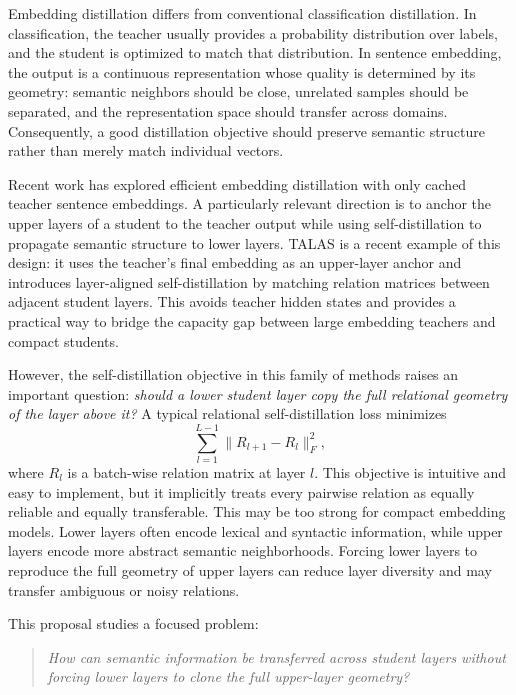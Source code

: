 \documentclass[letterpaper]{article}
\begin{document}
Embedding distillation differs from conventional classification distillation. In classification, the teacher usually provides a probability distribution over labels, and the student is optimized to match that distribution. In sentence embedding, the output is a continuous representation whose quality is determined by its geometry: semantic neighbors should be close, unrelated samples should be separated, and the representation space should transfer across domains. Consequently, a good distillation objective should preserve semantic structure rather than merely match individual vectors.

Recent work has explored efficient embedding distillation with only cached teacher sentence embeddings. A particularly relevant direction is to anchor the upper layers of a student to the teacher output while using self-distillation to propagate semantic structure to lower layers. TALAS is a recent example of this design: it uses the teacher's final embedding as an upper-layer anchor and introduces layer-aligned self-distillation by matching relation matrices between adjacent student layers. This avoids teacher hidden states and provides a practical way to bridge the capacity gap between large embedding teachers and compact students.

However, the self-distillation objective in this family of methods raises an important question: \emph{should a lower student layer copy the full relational geometry of the layer above it?} A typical relational self-distillation loss minimizes
\begin{equation}
    \sum_{l=1}^{L-1}\|R_{l+1}-R_l\|_F^2,
\end{equation}
where $R_l$ is a batch-wise relation matrix at layer $l$. This objective is intuitive and easy to implement, but it implicitly treats every pairwise relation as equally reliable and equally transferable. This may be too strong for compact embedding models. Lower layers often encode lexical and syntactic information, while upper layers encode more abstract semantic neighborhoods. Forcing lower layers to reproduce the full geometry of upper layers can reduce layer diversity and may transfer ambiguous or noisy relations.

This proposal studies a focused problem:
\begin{quote}
\emph{How can semantic information be transferred across student layers without forcing lower layers to clone the full upper-layer geometry?}
\end{quote}
\end{document}
